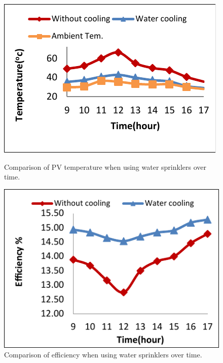 \begin{figure}[ht]
    \centering
    \begin{minipage}[b]{0.45\linewidth}
        \centering
        \includegraphics[width=\linewidth]{Figures/water_cooling_temperature_graph.pdf}
        \caption{Comparison of PV temperature when using water sprinklers over time. \cite{Al-Masalha2024ImprovingSystems}}
        \label{fig:water_cooling_temperature_graph}
    \end{minipage}
    \hfill
    \begin{minipage}[b]{0.45\linewidth}
        \centering
        \includegraphics[width=\linewidth]{Figures/water_cooling_efficiency_graph.pdf}
        \caption{Comparison of efficiency when using water sprinklers over time. \cite{Al-Masalha2024ImprovingSystems}}
        \label{fig:water_cooling_efficiency_graph}
    \end{minipage}
\end{figure}

